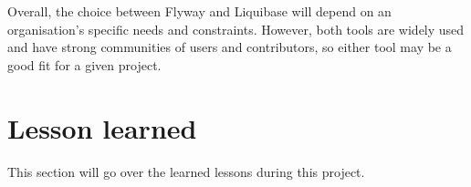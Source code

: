Overall, the choice between Flyway and Liquibase will depend on an organisation's specific needs and constraints. However, both tools are widely used and have strong communities of users and contributors, so either tool may be a good fit for a given project.






\section{Lesson learned}
This section will go over the learned lessons during this project.











